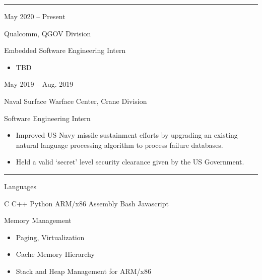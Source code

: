 \documentclass[a4paper]{article}
\newlength{\cvcolumngapwidth}
\newlength{\cvleftcolumnwidth}
\newlength{\cvrightcolumnwidth}
\newcommand{\cvsectionstyle}[1]{{\normalsize\cvsectionfont\textcolor{cvsectioncolor}{#1}}}
\newcommand{\cvtitlestyle}[1]{{\large\cvtitlefont\textcolor{cvtitlecolor}{#1}}}
\newcommand{\cvdurationstyle}[1]{{\small\cvdurationfont\textcolor{cvdurationcolor}{#1}}}
\newcommand{\cvheadingstyle}[1]{{\normalsize\cvheadingfont\textcolor{cvheadingcolor}{#1}}}
\newcommand{\italicstyle}[1]{{\small\italicfont\textcolor{cvsectioncolor}{#1}}}
\newlength{\cvafteritemskipamount}
\newlength{\cvaftersectionskipamount}
\newlength{\cvaftertitleskipamount}
\newlength{\cvparskip}
\newcommand{\cvsection}[1]{
    \begin{minipage}[t]{\cvleftcolumnwidth}
        \raggedleft\cvsectionstyle{#1}
    \end{minipage}%
    \hspace{\cvcolumngapwidth}%
    \begin{minipage}[t]{\cvrightcolumnwidth}
        \textcolor{cvrulecolor}{\rule{\cvrightcolumnwidth}{0.3mm}}
    \end{minipage}

    \vspace{\cvaftersectionskipamount}
}
\newcommand{\cvitem}[2]{
    \begin{minipage}[t]{\cvleftcolumnwidth}
        \raggedleft #1
    \end{minipage}%
    \hspace{\cvcolumngapwidth}%
    \begin{minipage}[t]{\cvrightcolumnwidth}
        \setlength{\parskip}{\cvparskip} #2
    \end{minipage}

    \vspace{\cvafteritemskipamount}
}
\newcommand{\cvtitle}[1]{
    \cvtitlestyle{#1}

    \vspace{\cvaftertitleskipamount}
    \vspace{-\cvparskip}
}
\begin{document}

\cvsection{\LARGE \textcolor{emphasiscolor}{EMPLOYMENT}}

\cvitem{
    \cvdurationstyle{May 2020 -- Present}
}{
    \cvtitle{Qualcomm, QGOV Division}

    \italicstyle{Embedded Software Engineering Intern}

    \normalsize
    \begin{itemize}[leftmargin=*]
        \item TBD
    \end{itemize}
    \vspace{2mm}
}

\cvitem{
    \cvdurationstyle{May 2019 -- Aug. 2019}
}{

    \cvtitle{Naval Surface Warface Center, Crane Division}

    \italicstyle{Software Engineering Intern}

    \normalsize
    \begin{itemize}[leftmargin=*]
        \item Improved US Navy missile sustainment efforts by upgrading an existing
natural language processing algorithm to process failure databases.
        \item Held a valid ‘secret’ level security clearance given by the US Government.
    \end{itemize}
}


\cvsection{\LARGE \textcolor{emphasiscolor}{EXPERTISE}}

\cvitem{
    \cvheadingstyle{Languages}
}{
  C \hspace{12mm} C++ \hspace{12mm} Python \hspace{12mm} ARM/x86 Assembly \hspace{12mm} Bash \hspace{12mm} Javascript
  \vspace{2mm}
}

\cvitem{
    \cvheadingstyle{Memory Management}
}{
    \begin{itemize}[leftmargin=*]
      \item Paging, Virtualization
      \item Cache Memory Hierarchy
      \item Stack and Heap Management for ARM/x86
    \end{itemize}
  \vspace{3mm}
}
\end{document}
